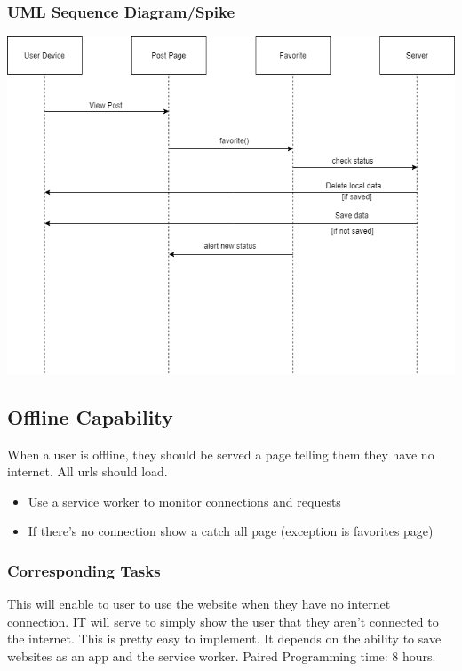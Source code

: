\documentclass[12pt]{article}
\begin{document}
\subsubsection{UML Sequence Diagram/Spike}
\includegraphics[scale=0.5]{img/9.png}\linebreak

\subsection{Offline Capability}
When a user is offline, they should be served a page telling them they have no
internet. All urls should load.
\begin{itemize}
  \item Use a service worker to monitor connections and requests
  \item If there’s no connection show a catch all page (exception is favorites page)
\end{itemize}
\subsubsection{Corresponding Tasks}
	This will enable to user to use the website when they have no internet connection.  IT will serve to simply show the user that they aren’t connected to the internet.  This is pretty easy to implement.  It depends on the ability to save websites as an app and the service worker.  Paired Programming time: 8 hours.
\end{document}
